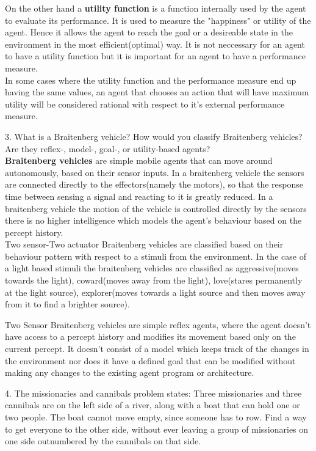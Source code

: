 \documentclass{scrartcl}
\begin{document}
On the other hand a \textbf{utility function} is a function internally used by the agent to evaluate its performance. It is used to measure the "happiness" or utility of the agent. Hence it allows the agent to reach the goal or a desireable state in the environment in the most efficient(optimal) way. It is not neccessary for an  agent to have a utility function but it is important for an agent to have a performance measure.\\

In some cases where the utility function and the performance measure end up having the same values, an agent that chooses an action that will have maximum utility will be considered rational with respect to it's external performance measure.

\newpage

3. What is a Braitenberg vehicle? How would you classify Braitenberg vehicles? Are they reflex-, model-, goal-, or utility-based agents?\\
\textbf{Braitenberg vehicles} are simple mobile agents that can move around autonomously,
based on their sensor inputs. In a braitenberg vehicle the sensors are connected directly to the effectors(namely the motors), so that the response time between sensing a signal and reacting to it is greatly reduced. In a braitenberg vehicle the motion of the vehicle is controlled directly by the sensors there is no higher intelligence which models the agent's behaviour based on the percept history.\\

Two sensor-Two actuator Braitenberg vehicles are classified based on their behaviour pattern with respect to a stimuli from the environment. In the case of a light based stimuli the braitenberg vehicles are classified as aggressive(moves towards the light), coward(moves away from the light), love(stares permanently at the light source), explorer(moves towards a light source and then moves away from it to find a brighter source). 

Two Sensor Braitenberg vehicles are simple reflex agents, where the agent doesn't have access to a percept history and modifies its movement based only on the current percept. It doesn't consist of a model which keeps track of the changes in the environment nor does it have a defined goal that can be modified without making any changes to the existing agent program or architecture.


\newpage

4. The missionaries and cannibals problem states: Three missionaries and three cannibals are on the left side of a river, along with a boat that can hold one or two people. The boat cannot move empty, since someone has to row. Find a way to get everyone to the other side, without ever leaving a group of missionaries on one side outnumbered by the cannibals on that side. \\
\end{document}
